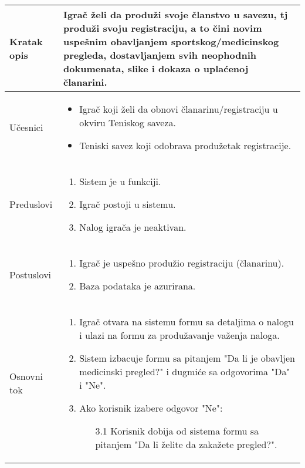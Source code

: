 \documentclass{article}
\begin{document}
       \begin{longtable}{| p{} | p{} |} 
            \hline
                Kratak opis & Igrač želi da produži svoje članstvo u savezu, tj produži svoju registraciju, a to čini novim uspešnim obavljanjem sportskog/medicinskog pregleda, dostavljanjem svih neophodnih dokumenata, slike i dokaza o uplaćenoj članarini.\\ 
            \hline    
                Učesnici & \begin{itemize}
                    \item Igrač koji želi da obnovi članarinu/registraciju u okviru Teniskog saveza.
                    \item Teniski savez koji odobrava produžetak registracije.
                \end{itemize} \\
            \hline
               Preduslovi & \begin{enumerate}
                   \item Sistem je u funkciji.
                   \item Igrač postoji u sistemu.
                   \item Nalog igrača je neaktivan.
               \end{enumerate}\\
            \hline  
                Postuslovi & \begin{enumerate}
                    \item Igrač je uspešno produžio registraciju (članarinu).
                    \item Baza podataka je azurirana.
                \end{enumerate}\\
            \hline
                Osnovni tok & \begin{enumerate}
                    \item Igrač otvara na sistemu formu sa detaljima o nalogu i ulazi na formu za produžavanje važenja naloga.
                    \item Sistem izbacuje formu sa pitanjem "Da li je obavljen medicinski pregled?" i dugmiće sa odgovorima "Da" i "Ne".
                    \item Ako korisnik izabere odgovor "Ne":
                    \begin{enumerate}
                        \item[3.1] Korisnik dobija od sistema formu sa pitanjem "Da li želite da zakažete pregled?".

\end{enumerate}
\end{enumerate}
\end{longtable}
\end{document}

